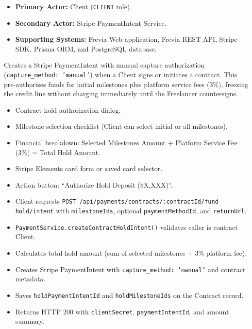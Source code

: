 \begin{itemize}[leftmargin=1.6em,topsep=3pt,itemsep=2pt,parsep=0pt,label=$\bullet$]
      \item \textbf{Primary Actor:} Client (\texttt{CLIENT} role).
      \item \textbf{Secondary Actor:} Stripe PaymentIntent Service.
      \item \textbf{Supporting Systems:} Frevia Web application, Frevia REST API, Stripe SDK, Prisma ORM, and PostgreSQL database.
\end{itemize}

\noindent Creates a Stripe PaymentIntent with manual capture authorization (\texttt{capture\_method: 'manual'}) when a Client signs or initiates a contract. This pre-authorizes funds for initial milestones plus platform service fees (3\%), freezing the credit line without charging immediately until the Freelancer countersigns.

\begin{itemize}[leftmargin=1.6em,topsep=3pt,itemsep=2pt,parsep=0pt,label=$\bullet$]
      \item Contract hold authorization dialog.
      \item Milestone selection checklist (Client can select initial or all milestones).
      \item Financial breakdown: Selected Milestones Amount + Platform Service Fee (3\%) = Total Hold Amount.
      \item Stripe Elements card form or saved card selector.
      \item Action button: ``Authorize Hold Deposit (\$X,XXX)''.
\end{itemize}

\begin{itemize}[leftmargin=1.6em,topsep=3pt,itemsep=2pt,parsep=0pt,label=$\bullet$]
      \item Client requests \texttt{POST /api/payments/contracts/:contractId/fund-hold/intent} with \texttt{milestoneIds}, optional \texttt{paymentMethodId}, and \texttt{returnUrl}.
      \item \texttt{PaymentService.createContractHoldIntent()} validates caller is contract Client.
      \item Calculates total hold amount (sum of selected milestones + 3\% platform fee).
      \item Creates Stripe PaymentIntent with \texttt{capture\_method: 'manual'} and contract metadata.
      \item Saves \texttt{holdPaymentIntentId} and \texttt{holdMilestoneIds} on the Contract record.
      \item Returns HTTP 200 with \texttt{clientSecret}, \texttt{paymentIntentId}, and amount summary.
\end{itemize}

